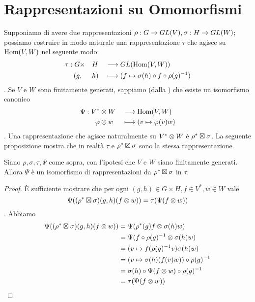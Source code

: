 \section{Rappresentazioni su Omomorfismi}

Supponiamo di avere due rappresentazioni $\rho:G\to GL(V),\allowbreak\sigma:H\to GL(W)$; possiamo costruire in modo naturale una rappresentazione $\tau$ che agisce su $\operatorname{Hom}(V,W)$ nel seguente modo:
\begin{alignat*}{3}
\tau:G&\times&& H&&\longrightarrow GL(\operatorname{Hom}(V,W))\\
(g&,&&h)&&\longmapsto (f\mapsto\sigma(h)\circ f\circ \rho(g)^{-1})
\end{alignat*}
. Se $V$ e $W$ sono finitamente generati, sappiamo (dalla ) che esiste un isomorfismo canonico
\begin{alignat*}{2}
\Psi:V^*&\otimes W&&\longrightarrow\operatorname{Hom}(V,W)\\
\varphi&\otimes w&&\longmapsto(v\mapsto \varphi(v)w)
\end{alignat*}
. Una rappresentazione che agisce naturalmente su $V^*\otimes W$ è $\rho^*\boxtimes\sigma$. La seguente proposizione mostra che in realtà $\tau$ e $\rho^*\boxtimes\sigma$ sono la stessa rappresentazione.

\begin{proposition}
Siano $\rho\comma\sigma\comma\tau\comma\Psi$ come sopra, con l'ipotesi che $V$ e $W$ siano finitamente generati. Allora $\Psi$ è un isomorfismo di rappresentazioni da $\rho^*\boxtimes\sigma$ in $\tau$.
\end{proposition}
\begin{proof}
È sufficiente mostrare che per ogni $(g,h)\in G\times H\comma f\in V^*\comma w\in W$ vale
$$
\Psi((\rho^*\boxtimes\sigma)(g,h)(f\otimes w))=\tau(\Psi(f\otimes w))
$$
. Abbiamo
\begin{align*}
\Psi((\rho^*\boxtimes\sigma)(g,h)(f\otimes w))&=\Psi(\rho^*(g)f\otimes\sigma(h)w)\\
&=\Psi(f\circ\rho(g)^{-1}\otimes\sigma(h)w)\\
&=(v\mapsto f(\rho(g)^{-1}v)\sigma(h)w)\\
&=(v\mapsto \sigma(h)(f(v)w))\circ \rho(g)^{-1}\\
&=\sigma(h)\circ\Psi(f\otimes w)\circ\rho(g)^{-1}\\
&=\tau(\Psi(f\otimes w))
\end{align*}
\end{proof}

